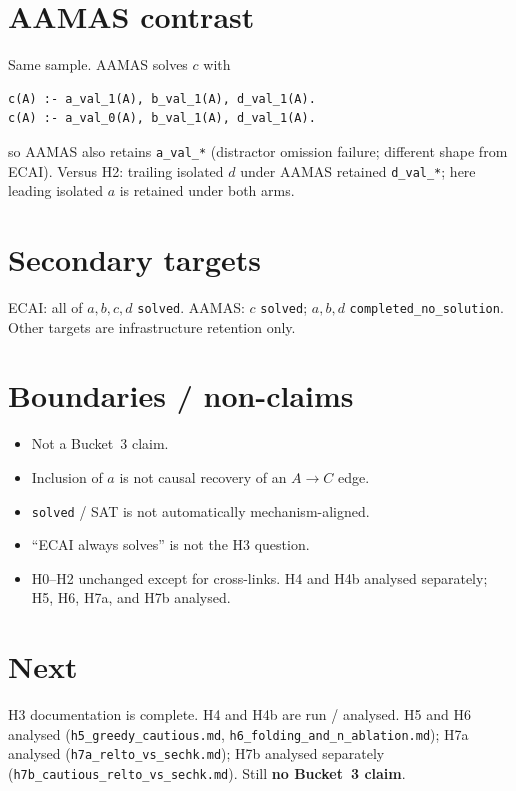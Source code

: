 \documentclass[11pt]{article}
\begin{document}
\section{AAMAS contrast}

Same sample. AAMAS solves \(c\) with
\begin{verbatim}
c(A) :- a_val_1(A), b_val_1(A), d_val_1(A).
c(A) :- a_val_0(A), b_val_1(A), d_val_1(A).
\end{verbatim}
so AAMAS also retains \texttt{a\_val\_*} (distractor omission failure; different
shape from ECAI).
Versus H2: trailing isolated \(d\) under AAMAS retained \texttt{d\_val\_*};
here leading isolated \(a\) is retained under both arms.

\section{Secondary targets}

ECAI: all of \(a,b,c,d\) \texttt{solved}.
AAMAS: \(c\) \texttt{solved}; \(a,b,d\) \texttt{completed\_no\_solution}.
Other targets are infrastructure retention only.

\section{Boundaries / non-claims}

\begin{itemize}
  \item Not a Bucket~3 claim.
  \item Inclusion of \(a\) is not causal recovery of an \(A\to C\) edge.
  \item \texttt{solved} / SAT is not automatically mechanism-aligned.
  \item ``ECAI always solves'' is not the H3 question.
  \item H0--H2 unchanged except for cross-links. H4 and H4b analysed
    separately; H5, H6, H7a, and H7b analysed.
\end{itemize}

\section{Next}

H3 documentation is complete.
H4 and H4b are run / analysed.
H5 and H6 analysed (\texttt{h5\_greedy\_cautious.md},
\texttt{h6\_folding\_and\_n\_ablation.md}); H7a analysed
(\texttt{h7a\_relto\_vs\_sechk.md}); H7b analysed separately
(\texttt{h7b\_cautious\_relto\_vs\_sechk.md}).
Still \textbf{no Bucket~3 claim}.
\end{document}
